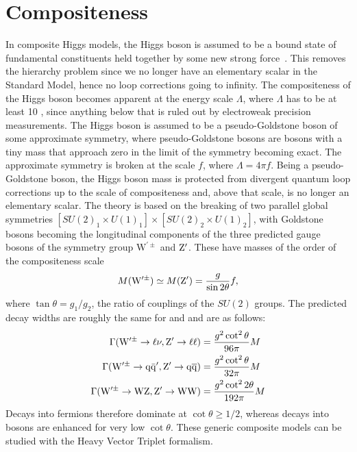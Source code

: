 \section{Compositeness}
In composite Higgs models, the Higgs boson is assumed to be a bound state of fundamental constituents held together by some new strong force~\cite{Bellazzini:2014yua,Contino:2011np}. This removes the hierarchy problem since we no longer have an elementary scalar in the Standard Model, hence no loop corrections going to infinity. The compositeness of the Higgs boson becomes apparent at the energy scale $\Lambda$, where $\Lambda$ has to be at least 10 \TeV, since anything below that is ruled out by electroweak precision measurements.
The Higgs boson is assumed to be a pseudo-Goldstone boson of some approximate symmetry, where pseudo-Goldstone bosons are bosons with a tiny mass that approach zero in the limit of the symmetry becoming exact. The approximate symmetry is broken at the scale $f$, where $\Lambda=4\pi f$. Being a pseudo-Goldstone boson, the Higgs boson mass is protected from divergent quantum loop corrections up to the scale of compositeness and, above that scale, is no longer an elementary scalar.
The theory is based on the breaking of two parallel global symmetries $[SU(2)_1 \times U(1)_1]\times[SU(2)_2 \times U(1)_2]$, with Goldstone bosons becoming the longitudinal components of the three predicted gauge bosons of the symmetry group $\mathrm{W}^{\prime\pm}$ and $\mathrm{Z}^\prime$. These have masses of the order of the compositeness scale
\begin{equation}\label{eqn:LHvprimeMass}
M(\mathrm{W}^{\prime\pm}) \simeq M(\mathrm{Z}^\prime) = \frac{g}{\sin2\theta}f,
\end{equation}
\noindent where $\tan\theta = g_1/g_2$, the ratio of couplings of the $SU(2)$ groups. The predicted decay widths are roughly the same for \PZpr and \PWpr and are as follows:
\begin{equation}
\begin{aligned}
\Gamma(\mathrm{W}^{\prime\pm} \to \ell\nu, \mathrm{Z}^\prime \to \ell\ell) & = \frac{g^2\cot^2\theta}{96\pi}M\\
\Gamma(\mathrm{W}^{\prime\pm} \to \mathrm{q}\bar{\mathrm{q}}^\prime,\mathrm{Z}^\prime \to \mathrm{q}\overline{\mathrm{q}}) & = \frac{g^2\cot^2\theta}{32\pi}M\\
\Gamma(\mathrm{W}^{\prime\pm} \to \mathrm{W}\mathrm{Z},\mathrm{Z}^\prime \to \mathrm{W}\mathrm{W}) & = \frac{g^2\cot^22\theta}{192\pi}M
\end{aligned} 
\end{equation}
Decays into fermions therefore dominate at $\cot\theta \geq 1/2$, whereas decays into bosons are enhanced for very low $\cot\theta$. These generic composite models can be studied with the Heavy Vector Triplet formalism.

